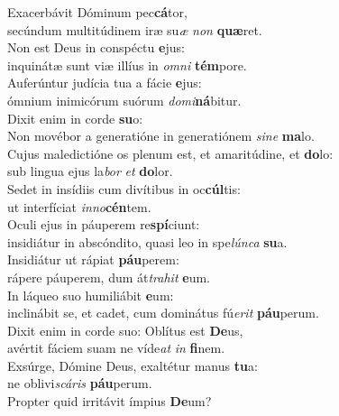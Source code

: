 \oddverse Exacerbávit Dóminum pec\textbf{cá}tor,~\*\\
\oddverse secúndum multitúdinem iræ su\textit{æ} \textit{non} \textbf{quæ}ret.\\
\evenverse Non est Deus in conspéctu \textbf{e}jus:~\*\\
\evenverse inquinátæ sunt viæ illíus in \textit{om}\textit{ni} \textbf{tém}pore.\\
\oddverse Auferúntur judícia tua a fácie \textbf{e}jus:~\*\\
\oddverse ómnium inimicórum suórum \textit{do}\textit{mi}\textbf{ná}bitur.\\
\evenverse Dixit enim in corde \textbf{su}o:~\*\\
\evenverse Non movébor a generatióne in generatiónem \textit{si}\textit{ne} \textbf{ma}lo.\\
\oddverse Cujus maledictióne os plenum est, et amaritúdine, et \textbf{do}lo:~\*\\
\oddverse sub lingua ejus la\textit{bor} \textit{et} \textbf{do}lor.\\
\evenverse Sedet in insídiis cum divítibus in oc\textbf{cúl}tis:~\*\\
\evenverse ut interfíciat \textit{in}\textit{no}\textbf{cén}tem.\\
\oddverse Oculi ejus in páuperem re\textbf{spí}ciunt:~\*\\
\oddverse insidiátur in abscóndito, quasi leo in spe\textit{lún}\textit{ca} \textbf{su}a.\\
\evenverse Insidiátur ut rápiat \textbf{páu}perem:~\*\\
\evenverse rápere páuperem, dum át\textit{tra}\textit{hit} \textbf{e}um.\\
\oddverse In láqueo suo humiliábit \textbf{e}um:~\*\\
\oddverse inclinábit se, et cadet, cum dominátus fú\textit{e}\textit{rit} \textbf{páu}perum.\\
\evenverse Dixit enim in corde suo: Oblítus est \textbf{De}us,~\*\\
\evenverse avértit fáciem suam ne víde\textit{at} \textit{in} \textbf{fi}nem.\\
\oddverse Exsúrge, Dómine Deus, exaltétur manus \textbf{tu}a:~\*\\
\oddverse ne oblivi\textit{scá}\textit{ris} \textbf{páu}perum.\\
\evenverse Propter quid irritávit ímpius \textbf{De}um?~\*\\
